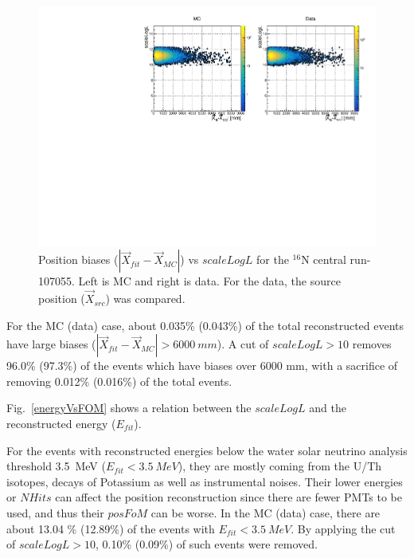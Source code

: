 \begin{figure}
	\centering
		\includegraphics[width=13cm]{N16_107055_scaleLogLvsPosBias.pdf}
	\caption{Position biases ($|\vec{X}_{fit}-\vec{X}_{MC}|$) vs $scaleLogL$ for the $^{16}$N central run-107055. Left is MC and right is data. For the data, the source position ($\vec{X}_{src}$) was compared.}
	\label{posBiasVsFOM}
\end{figure}

For the MC (data) case, about 0.035\% (0.043\%) of the total reconstructed events have large biases ($|\vec{X}_{fit}-\vec{X}_{MC}|>6000~mm$). A cut of $scaleLogL>10$ removes 96.0\% (97.3\%) of the events which have biases over 6000 mm, with a sacrifice of removing 0.012\% (0.016\%) of the total events.

Fig.~\ref{energyVsFOM} shows a relation between the $scaleLogL$ and the reconstructed energy ($E_{fit}$). 

For the events with reconstructed energies below the water solar neutrino analysis threshold 3.5~MeV ($E_{fit}<3.5~MeV$), they are mostly coming from the U/Th isotopes, decays of Potassium as well as instrumental noises\cite{waterunidoc}. Their lower energies or $NHits$ can affect the position reconstruction since there are fewer PMTs to be used, and thus their $posFoM$ can be worse.
In the MC (data) case, there are about 13.04 \% (12.89\%) of the events with $E_{fit}<3.5~MeV$. By applying the cut of $scaleLogL>10$, 0.10\% (0.09\%) of such events were removed.

